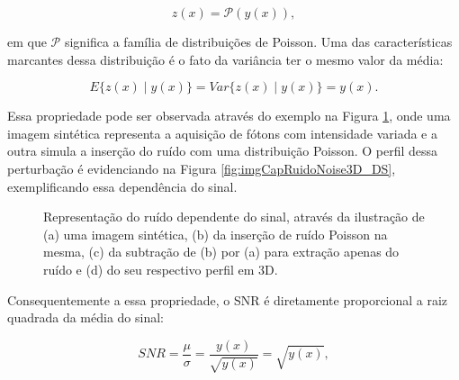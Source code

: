 \begin{equation}
z(x) =  \mathcal{P}(y(x)),
\label{eq:eqCapRuidoQuantico}
\end{equation}

\noindent em que $\mathcal{P}$ significa a família de distribuições de Poisson. Uma das características marcantes dessa distribuição é o fato da variância ter o mesmo valor da média:

\begin{equation}
 E\{z(x)\mid y(x)\} =  Var\{z(x)\mid y(x)\} = y(x).
\label{eq:eqCapRuidoQuanticoMediaVar}
\end{equation}

Essa propriedade pode ser observada através do exemplo na Figura \ref{fig:imgCapRuidoPoisson}, onde uma imagem sintética representa a aquisição de fótons com intensidade variada e a outra simula a inserção do ruído com uma distribuição Poisson. O perfil dessa perturbação é evidenciando na Figura \ref{fig:imgCapRuidoNoise3D_DS}, exemplificando essa dependência do sinal. 

\begin{figure}[!htb]
	\centering
	
	\caption{Representação do ruído dependente do sinal, através da ilustração de (a) uma imagem sintética, (b) da inserção de ruído Poisson na mesma, (c) da subtração de (b) por (a) para extração apenas do ruído e (d) do seu respectivo perfil em \acs{3D}.}
	
	\hfill
	\hfill
	\hfill
	
	\label{fig:imgCapRuidoPoisson}
\end{figure}

Consequentemente a essa propriedade, o \acs{SNR} é diretamente proporcional a raiz quadrada da média do sinal:

\begin{equation}
SNR =  \dfrac{\mu}{\sigma} =  \dfrac{y(x)}{\sqrt{y(x)}}  = \sqrt{y(x)},
\label{eq:eqCapRuidoQuanticoSNR}
\end{equation}

